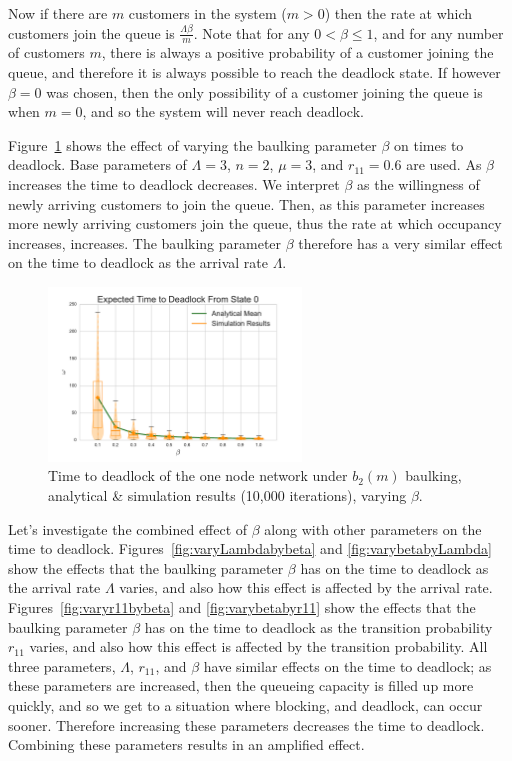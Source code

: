 \documentclass{article}
\begin{document}
Now if there are $m$ customers in the system ($m > 0$) then the rate at which customers join the queue is $\frac{\Lambda \beta}{m}$.
Note that for any $0 < \beta \leq 1$, and for any number of customers $m$, there is always a positive probability of a customer joining the queue, and therefore it is always possible to reach the deadlock state.
If however $\beta = 0$ was chosen, then the only possibility of a customer joining the queue is when $m = 0$, and so the system will never reach deadlock.

Figure~\ref{fig:varybeta} shows the effect of varying the baulking parameter $\beta$ on times to deadlock.
Base parameters of $\Lambda = 3$, $n = 2$, $\mu = 3$, and $r_{11} = 0.6$ are used.
As $\beta$ increases the time to deadlock decreases.
We interpret $\beta$ as the willingness of newly arriving customers to join the queue.
Then, as this parameter increases more newly arriving customers join the queue, thus the rate at which occupancy increases, increases.
The baulking parameter $\beta$ therefore has a very similar effect on the time to deadlock as the arrival rate $\Lambda$.

\begin{figure}[!hbtp]
    \begin{center}
        \includegraphics[width=0.6\textwidth]{img/vary_beta.pdf}
    \end{center}
    \caption{Time to deadlock of the one node network under $b_2(m)$ baulking, analytical \& simulation results (10,000 iterations), varying $\beta$.}
    \label{fig:varybeta}
\end{figure}

Let's investigate the combined effect of $\beta$ along with other parameters on the time to deadlock.
Figures~\ref{fig:varyLambdabybeta} and \ref{fig:varybetabyLambda} show the effects that the baulking parameter $\beta$ has on the time to deadlock as the arrival rate $\Lambda$ varies, and also how this effect is affected by the arrival rate.
Figures~\ref{fig:varyr11bybeta} and \ref{fig:varybetabyr11} show the effects that the baulking parameter $\beta$ has on the time to deadlock as the transition probability $r_{11}$ varies, and also how this effect is affected by the transition probability.
All three parameters, $\Lambda$, $r_{11}$, and $\beta$ have similar effects on the time to deadlock; as these parameters are increased, then the queueing capacity is filled up more quickly, and so we get to a situation where blocking, and deadlock, can occur sooner.
Therefore increasing these parameters decreases the time to deadlock.
Combining these parameters results in an amplified effect.
\end{document}
